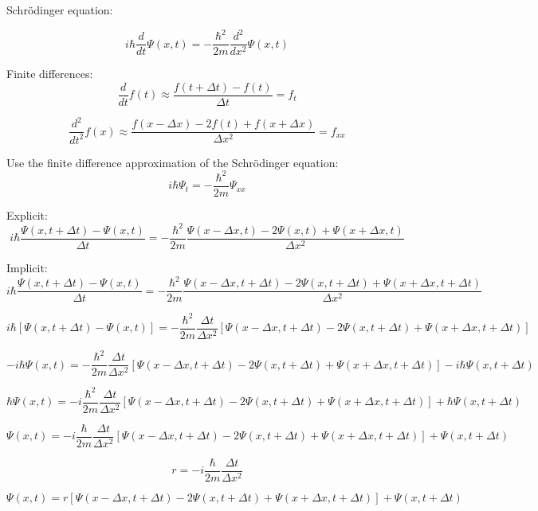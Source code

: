 \documentclass[12pt]{article}
\begin{document}
Schr\"{o}dinger equation:

\[ 
    i \hbar \frac{d}{dt} \Psi(x, t) = 
    -\frac{\hbar^2}{2m} \frac{d^2}{dx^2} \Psi(x, t) 
\]

Finite differences:
\[
    \frac{d}{dt} f(t) 
        \approx \frac{f(t + \Delta t) - f(t)}{\Delta t}
        = f_t
\]

\[
    \frac{d^2}{dt^2} f(x) 
        \approx \frac{f(x - \Delta x) - 2 f(t) + f(x + \Delta x)}{\Delta x^2}
        = f_{xx}
\]

Use the finite difference approximation of the Schr\"{o}dinger equation:
\[ 
    i \hbar \Psi_t = 
    -\frac{\hbar^2}{2m} \Psi_{xx}
\]

Explicit:
\[ 
    i \hbar \frac{\Psi(x, t + \Delta t) - \Psi(x, t)}{\Delta t} 
    = -\frac{\hbar^2}{2m} \frac{\Psi(x - \Delta x, t) - 2 \Psi(x, t) + \Psi(x + \Delta x, t)}{\Delta x^2}
\]

Implicit:
\[ 
    i \hbar \frac{\Psi(x, t + \Delta t) - \Psi(x, t)}{\Delta t} 
    = -\frac{\hbar^2}{2m} \frac{\Psi(x - \Delta x, t + \Delta t) - 2 \Psi(x, t + \Delta t) + \Psi(x + \Delta x, t + \Delta t)}{\Delta x^2}
\]

\[ 
    i \hbar \left[ \Psi(x, t + \Delta t) - \Psi(x, t) \right]
    = -\frac{\hbar^2}{2m} \frac{\Delta t}{\Delta x^2} \left[ \Psi(x - \Delta x, t + \Delta t) - 2
    \Psi(x, t + \Delta t) + \Psi(x + \Delta x, t + \Delta t) \right]
\]

\[ 
    - i \hbar \Psi(x, t)
    = -\frac{\hbar^2}{2m} \frac{\Delta t}{\Delta x^2} \left[ \Psi(x - \Delta x, t + \Delta t) - 2
    \Psi(x, t + \Delta t) + \Psi(x + \Delta x, t + \Delta t) \right] - i \hbar \Psi(x, t + \Delta t)
\]

\[ 
    \hbar \Psi(x, t)
    = -i \frac{\hbar^2}{2m} \frac{\Delta t}{\Delta x^2} \left[ \Psi(x - \Delta x, t + \Delta t) - 2
    \Psi(x, t + \Delta t) + \Psi(x + \Delta x, t + \Delta t) \right] + \hbar \Psi(x, t + \Delta t)
\]

\[ 
    \Psi(x, t)
    = -i \frac{\hbar}{2m} \frac{\Delta t}{\Delta x^2} \left[ \Psi(x - \Delta x, t + \Delta t) - 2
    \Psi(x, t + \Delta t) + \Psi(x + \Delta x, t + \Delta t) \right] + \Psi(x, t + \Delta t)
\]

\[ r = -i \frac{\hbar}{2m} \frac{\Delta t}{\Delta x^2} \]

\[ 
    \Psi(x, t)
    = r \left[ \Psi(x - \Delta x, t + \Delta t) - 2
    \Psi(x, t + \Delta t) + \Psi(x + \Delta x, t + \Delta t) \right] + \Psi(x, t + \Delta t)
\]
\end{document}

